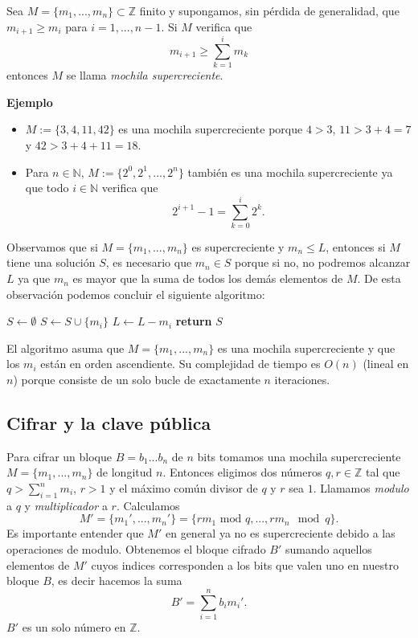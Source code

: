\documentclass[12pt]{article}
\newcommand{\N}{\mathbb{N}}
\newcommand{\Z}{\mathbb{Z}}
\newenvironment{definition}[2][Definición]{\begin{trivlist}
\item[\hskip \labelsep {\bfseries #1}]}{\end{trivlist}}
\begin{document}
\begin{definition}{1}
Sea $M = \{m_1, ..., m_n\} \subset \Z$ finito y supongamos, sin pérdida de generalidad, que $m_{i+1} \geq m_i$ para $i = 1, ..., n-1$. Si $M$ verifica que
$$m_{i+1} \geq \sum_{k=1}^im_k$$
entonces $M$ se llama \emph{mochila supercreciente}.
\end{definition}
\textbf{Ejemplo}
\begin{itemize}
\item
$M := \{3, 4, 11, 42\}$ es una mochila supercreciente porque $4 > 3$, $11 > 3 + 4 = 7$ y $42 > 3 + 4 + 11 = 18$.

\item 
Para $n \in \N$, $M := \{2^0, 2^1, ..., 2^n\}$ también es una mochila supercreciente ya que todo $i \in \N$ verifica que
$$2^{i+1} - 1 = \sum_{k=0}^i2^k.$$
\end{itemize}
Observamos que si $M = \{m_1, ..., m_n\}$ es supercreciente y $m_n \leq L$, entonces si $M$ tiene una solución $S$, es necesario que $m_n \in S$ porque si no, no podremos alcanzar $L$ ya que $m_n$ es mayor que la suma de todos los demás elementos de $M$.
De esta observación podemos concluir el siguiente algoritmo:
\vspace{1em}
\begin{algorithmic}[1]
\State $S \gets \emptyset$
		\State $S \gets S \cup \{m_i\}$
		\State $L \gets L - m_i$
	\EndIf
\EndFor
\State \textbf{return} $S$
\EndProcedure
\end{algorithmic}
\vspace{1em}
El algoritmo asuma que $M = \{m_1,...,m_n\}$ es una mochila supercreciente y que los $m_i$ están en orden ascendiente. Su complejidad de tiempo es $O(n)$ (lineal en $n$) porque consiste de un solo bucle de exactamente $n$ iteraciones.

\subsection*{Cifrar y la clave pública}

Para cifrar un bloque $B = b_1...b_n$ de $n$ bits tomamos una mochila supercreciente $M = \{m_1, ..., m_n\}$ de longitud $n$. Entonces eligimos dos números $q, r \in \Z$ tal que $q > \sum_{i=1}^nm_i$, $r > 1$ y el máximo común divisor de $q$ y $r$ sea $1$. Llamamos \emph{modulo} a $q$ y \emph{multiplicador} a $r$. Calculamos
$$M' = \{m_1', ..., m_n'\} = \{r m_1 \text{ mod } q, ..., r m_n \mod q\}.$$
Es importante entender que $M'$ en general ya no es supercreciente debido a las operaciones de modulo. Obtenemos el bloque cifrado $B'$ sumando aquellos elementos de $M'$ cuyos indices corresponden a los bits que valen uno en nuestro bloque $B$, es decir hacemos la suma
$$B' = \sum_{i=1}^nb_im_i'.$$
$B'$ es un solo número en $\Z$.
\end{document}
